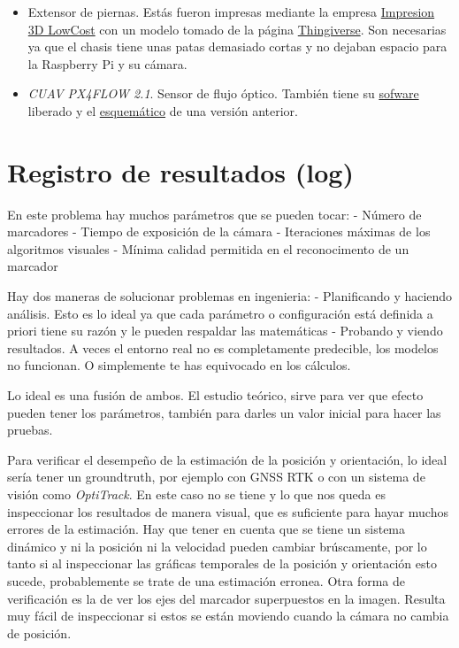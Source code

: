 \begin{itemize}
\item Extensor de piernas. Estás fueron impresas mediante la empresa \href{https://impresion3dlowcost.es/}{Impresion 3D LowCost} con un modelo tomado de la página \href{https://www.thingiverse.com/thing:915639}{Thingiverse}. Son necesarias ya que el chasis tiene unas patas demasiado cortas y no dejaban espacio para la Raspberry Pi y su cámara. 
\item \textit{CUAV PX4FLOW 2.1}. Sensor de flujo óptico. También tiene su \href{https://github.com/PX4/PX4-Flow}{sofware} liberado y el \href{https://github.com/pixhawk/Hardware/tree/master/FLOWv1}{esquemático} de una versión anterior.
\end{itemize}



\section{Registro de resultados (log)} 

En este problema hay muchos parámetros que se pueden tocar:
- Número de marcadores
- Tiempo de exposición de la cámara
- Iteraciones máximas de los algoritmos visuales
- Mínima calidad permitida en el reconocimento de un marcador 

Hay dos maneras de solucionar problemas en ingenieria:
- Planificando y haciendo análisis. Esto es lo ideal ya que cada parámetro o configuración está definida a priori tiene su razón y le pueden respaldar las matemáticas
- Probando y viendo resultados. A veces el entorno real no es completamente predecible, los modelos no funcionan. O simplemente te has equivocado en los cálculos.

Lo ideal es una fusión de ambos. El estudio teórico, sirve para ver que efecto pueden tener los parámetros, también para darles un valor inicial para hacer las pruebas.  

Para verificar el desempeño de la estimación de la posición y orientación, lo ideal sería tener un groundtruth, por ejemplo con GNSS RTK o con un sistema de visión como \textit{OptiTrack}. En este caso no se tiene y lo que nos queda es inspeccionar los resultados de manera visual, que es suficiente para hayar muchos errores de la estimación. Hay que tener en cuenta que se tiene un sistema dinámico y ni la posición ni la velocidad pueden cambiar brúscamente, por lo tanto si al inspeccionar las gráficas temporales de la posición y orientación esto sucede, probablemente se trate de una estimación erronea. Otra forma de verificación es la de ver los ejes del marcador superpuestos en la imagen. Resulta muy fácil de inspeccionar si estos se están moviendo cuando la cámara no cambia de posición.    


